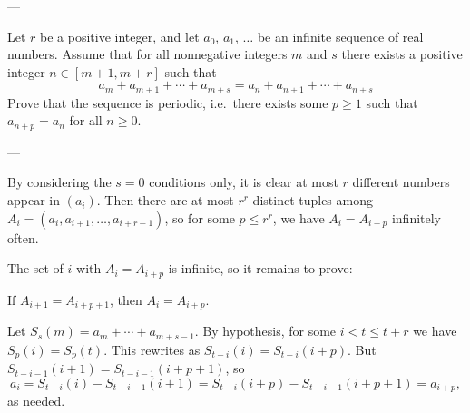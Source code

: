 
---

Let $r$ be a positive integer, and let $a_0$, $a_1$, $\ldots$ be an infinite sequence of real numbers. Assume that for all nonnegative integers $m$ and $s$ there exists a positive integer $n\in[m+1,m+r]$ such that
\[a_m+a_{m+1}+\cdots+a_{m+s}=a_n+a_{n+1}+\cdots+a_{n+s}\]
Prove that the sequence is periodic, i.e.\ there exists some $p\ge1$ such that $a_{n+p}=a_n$ for all $n\ge0$.

---

By considering the $s=0$ conditions only, it is clear at most $r$ different numbers appear in $(a_i)$. Then there are at most $r^r$ distinct tuples among $A_i=(a_i,a_{i+1},\ldots,a_{i+r-1})$, so for some $p\le r^r$, we have $A_i=A_{i+p}$ infinitely often.

The set of $i$ with $A_i=A_{i+p}$ is infinite, so it remains to prove:
\begin{claim*}
    If $A_{i+1}=A_{i+p+1}$, then $A_i=A_{i+p}$.
\end{claim*}
Let $S_s(m)=a_m+\cdots+a_{m+s-1}$. By hypothesis, for some $i<t\le t+r$ we have $S_p(i)=S_p(t)$. This rewrites as $S_{t-i}(i)=S_{t-i}(i+p)$. But $S_{t-i-1}(i+1)=S_{t-i-1}(i+p+1)$, so \[a_i=S_{t-i}(i)-S_{t-i-1}(i+1)=S_{t-i}(i+p)-S_{t-i-1}(i+p+1)=a_{i+p},\]
as needed.

